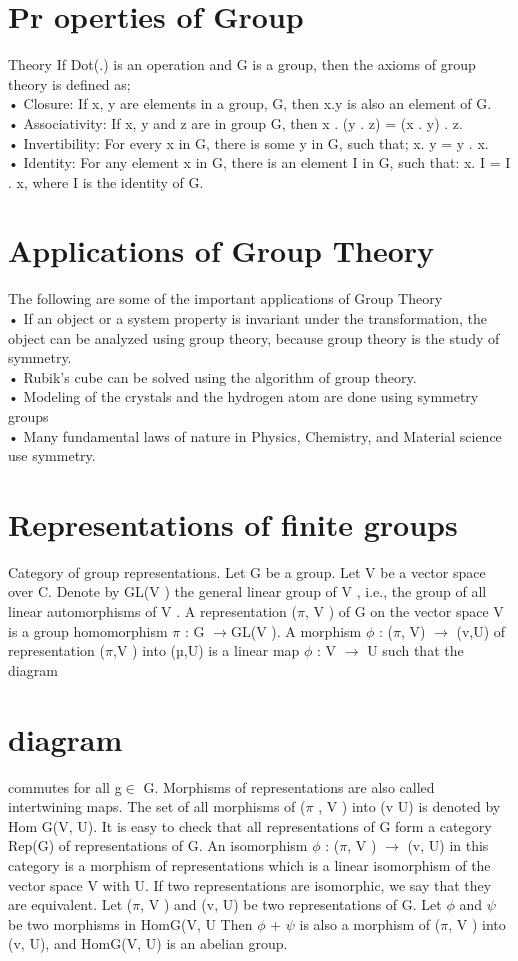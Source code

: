 \documentclass[18pt,a4paper]{article}
\begin{document}
\section{Pr
operties of Group}
Theory If Dot(.) is an operation and G is a group, then the axioms of group theory is defined as;
\\•	Closure: If x, y are elements in a group, G, then x.y is also an element of G.
\\•	Associativity: If x, y and z are in group G, then x . (y . z) = (x . y) . z.
\\•	Invertibility: For every x in G, there is some y in G, such that; x. y = y . x.
\\•	Identity: For any element x in G, there is an element I in G, such that: x. I = I . x, where I is the identity of G.

\section{Applications of Group Theory}
The following are some of the important applications of Group Theory
\\•	 If an object or a system property is invariant under the transformation, the object can be analyzed using group theory, because group theory is the study of symmetry.
\\•	Rubik’s cube can be solved using the algorithm of group theory.
\\•	Modeling of the crystals and the hydrogen atom are done using symmetry groups
\\  •	Many fundamental laws of nature in Physics, Chemistry, and Material science use symmetry. 
\section{Representations of finite groups }
Category of group representations. Let G be a group. Let V be a vector space over C. Denote by GL(V ) the general linear group of V , i.e., the group of all linear automorphisms of V . A representation ($\pi$, V ) of G on the vector space V is a group homomorphism $\pi$ : G $\rightarrow$GL(V ). A morphism $\phi$ : ($\pi$, V) $\rightarrow$ (v,U) of representation ($\pi$,V ) into (µ,U) is a linear map $\phi$ : V $\rightarrow$ U such that the diagram 
 \section{diagram}

commutes for all g$\in$ G. Morphisms of representations are also called intertwining maps. The set of all morphisms of      ($\pi$ , V ) into (v U) is denoted by Hom G(V, U).
    It is easy to check that all representations of G form a category Rep(G) of representations of G. 
An isomorphism $\phi$ : ($\pi$, V ) $\rightarrow$ (v, U) in this category is a morphism of representations which is a linear isomorphism of the vector space V with U. If two representations are isomorphic, we say that they are equivalent.
     Let ($\pi$, V ) and (v, U) be two representations of G. Let $\phi$ and $\psi$ be two morphisms in HomG(V, U Then $\phi$ + $\psi$ is also a morphism of ($\pi$, V ) into (v, U), and HomG(V, U) is an abelian group.
\end{document}
